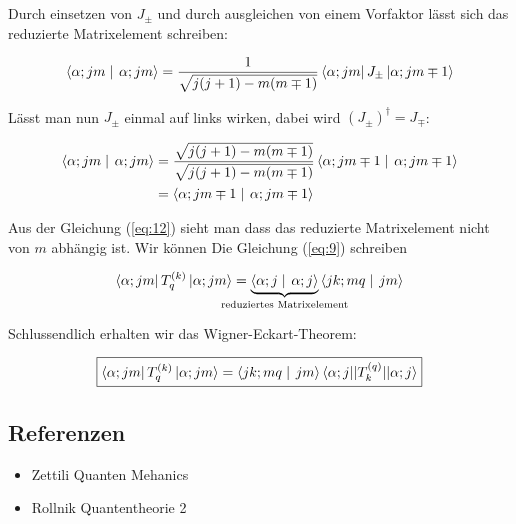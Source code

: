 Durch einsetzen von \(J_{\pm}\) und durch ausgleichen von einem Vorfaktor lässt sich das reduzierte Matrixelement schreiben:


\begin{align}
  \label{eq:10}
  \braket{\alpha;jm}{\alpha; jm} = \frac{1}{\sqrt{j(j+1)-m(m\mp 1)}}  \bra{\alpha;jm}J_{\pm} \ket{\alpha; jm\mp 1}
\end{align}

Lässt man nun \(J_{\pm}\) einmal auf links wirken, dabei wird \((J_{\pm})^\dagger = J_{\mp}\):

\begin{align}
  \label{eq:12}
  \braket{\alpha;jm}{\alpha; jm} &= \frac{\sqrt{j(j+1)-m(m\mp 1)}}{\sqrt{j(j+1)-m(m\mp 1)}}  \braket{\alpha;jm\mp 1 }{\alpha; jm\mp 1} \\
&= \braket{\alpha;jm\mp 1 }{\alpha; jm\mp 1}
\end{align}

Aus der Gleichung (\ref{eq:12}) sieht man dass das reduzierte Matrixelement nicht von \(m\) abhängig ist. Wir können Die Gleichung (\ref{eq:9}) schreiben

\begin{equation}
  \label{eq:14}
   \bra{\alpha;jm} T^{(k)}_q  \ket{\alpha;jm} =  \underbr{\braket{\alpha;j}{\alpha; j}}_{\text{reduziertes Matrixelement}}   \braket{jk;mq}{jm}
\end{equation}

Schlussendlich erhalten wir das Wigner-Eckart-Theorem:

\begin{equation}
  \label{eq:15}
\boxed{\bra{\alpha;jm} T^{(k)}_q  \ket{\alpha;jm} =  \braket{jk;mq}{jm} \langle \alpha;j || T^{(q)}_k || \alpha; j \rangle }
\end{equation}


\subsection*{Referenzen}
\begin{itemize}
\item Zettili Quanten Mehanics
\item Rollnik Quantentheorie 2
\end{itemize}


